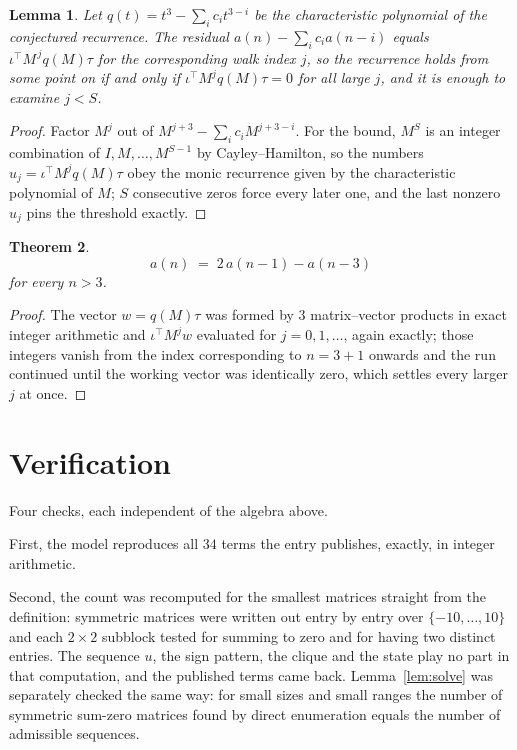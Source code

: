 \documentclass[11pt,a4paper]{article}
\theoremstyle{plain}
\newtheorem{theorem}{Theorem}
\newtheorem{lemma}[theorem]{Lemma}
\theoremstyle{definition}
\begin{document}
\begin{lemma}\label{lem:crit}
Let $q(t)=t^{3}-\sum_i c_it^{3-i}$ be the characteristic polynomial of the
conjectured recurrence. The residual $a(n)-\sum_ic_ia(n-i)$ equals
$\iota^{\!\top}M^{\,j}q(M)\tau$ for the corresponding walk index $j$, so the recurrence
holds from some point on if and only if $\iota^{\!\top}M^{j}q(M)\tau=0$ for all large $j$,
and it is enough to examine $j<S$.
\end{lemma}

\begin{proof}
Factor $M^{j}$ out of $M^{j+3}-\sum_ic_iM^{j+3-i}$. For the bound, $M^{S}$
is an integer combination of $I,M,\dots,M^{S-1}$ by Cayley--Hamilton, so the numbers
$u_j=\iota^{\!\top}M^{j}q(M)\tau$ obey the monic recurrence given by the characteristic
polynomial of $M$; $S$ consecutive zeros force every later one, and the last nonzero $u_j$
pins the threshold exactly.
\end{proof}

\begin{theorem}
\[
a(n)\;=\;2\,a(n-1) - a(n-3)
\]
for every $n>3$.
\end{theorem}

\begin{proof}
The vector $w=q(M)\tau$ was formed by $3$ matrix--vector products in exact integer
arithmetic and $\iota^{\!\top}M^{j}w$ evaluated for $j=0,1,\dots$, again exactly; those
integers vanish from the index corresponding to $n=3+1$ onwards and the run continued
until the working vector was identically zero, which settles every larger $j$ at once.
\end{proof}

\section{Verification}

Four checks, each independent of the algebra above.

First, the model reproduces all $34$ terms the entry publishes, exactly, in integer
arithmetic.

Second, the count was recomputed for the smallest matrices straight from the definition:
symmetric matrices were written out entry by entry over $\{-10,\dots,10\}$ and each
$2\times2$ subblock tested for summing to zero and for having two distinct entries. The
sequence $u$, the sign pattern, the clique and the state play no part in that computation, and
the published terms came back. Lemma~\ref{lem:solve} was separately checked the same way: for
small sizes and small ranges the number of symmetric sum-zero matrices found by direct
enumeration equals the number of admissible sequences.
\end{document}
